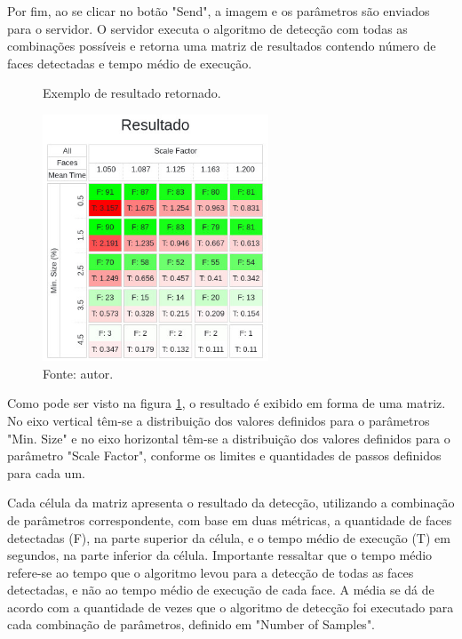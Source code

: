 Por fim, ao se clicar no botão "Send", a imagem e os parâmetros são enviados para o servidor. O servidor executa o algoritmo de detecção com todas as combinações possíveis e retorna uma matriz de resultados contendo número de faces detectadas e tempo médio de execução.

\begin{figure}[h]
    \centering
    \caption[Exemplo de resultado retornado.]{Exemplo de resultado retornado.}
    \includegraphics[width=0.6\textwidth]{Cap3_Desenvolvimento/Figures/exemplo_resultado_matriz.jpg}
    \caption*{Fonte: autor.}
    \label{fig:matrizResultado}
\end{figure}

Como pode ser visto na figura \ref{fig:matrizResultado}, o resultado é exibido em forma de uma matriz. No eixo vertical têm-se a distribuição dos valores definidos para o parâmetros "Min. Size" e no eixo horizontal têm-se a distribuição dos valores definidos para o parâmetro "Scale Factor", conforme os limites e quantidades de passos definidos para cada um.

Cada célula da matriz apresenta o resultado da detecção, utilizando a combinação de parâmetros correspondente, com base em duas métricas, a quantidade de faces detectadas (F), na parte superior da célula, e o tempo médio de execução (T) em segundos, na parte inferior da célula. Importante ressaltar que o tempo médio refere-se ao tempo que o algoritmo levou para a detecção de todas as faces detectadas, e não ao tempo médio de execução de cada face. A média se dá de acordo com a quantidade de vezes que o algoritmo de detecção foi executado para cada combinação de parâmetros, definido em "Number of Samples".

